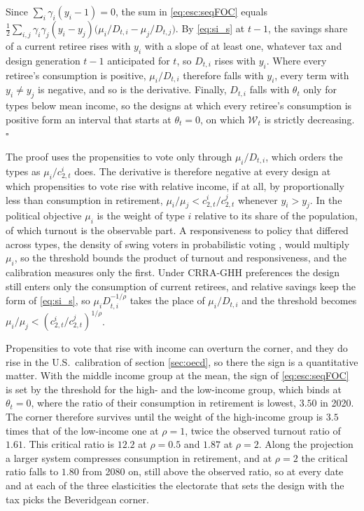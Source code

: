  Since $\sum_i\gamma_i(y_i-1) = 0$, the sum in \eqref{eq:esc:seqFOC} equals $\frac{1}{2}\sum_{i,j}\gamma_i\gamma_j(y_i-y_j)\big(\mu_i/D_{t,i}-\mu_j/D_{t,j}\big)$. By \eqref{eq:si_s} at $t-1$, the savings share of a current retiree rises with $y_i$ with a slope of at least one, whatever tax and design generation $t-1$ anticipated for $t$, so $D_{t,i}$ rises with $y_i$. Where every retiree's consumption is positive, $\mu_i/D_{t,i}$ therefore falls with $y_i$, every term with $y_i \neq y_j$ is negative, and so is the derivative. Finally, $D_{t,i}$ falls with $\theta_t$ only for types below mean income, so the designs at which every retiree's consumption is positive form an interval that starts at $\theta_t = 0$, on which $\mathcal{W}_t$ is strictly decreasing. $\square$

\bigskip
The proof uses the propensities to vote only through $\mu_i/D_{t,i}$, which orders the types as $\mu_i/c_{2,t}^i$ does. The derivative is therefore negative at every design at which propensities to vote rise with relative income, if at all, by proportionally less than consumption in retirement, $\mu_i/\mu_j < c_{2,t}^i/c_{2,t}^j$ whenever $y_i > y_j$. In the political objective $\mu_i$ is the weight of type $i$ relative to its share of the population, of which turnout is the observable part. A responsiveness to policy that differed across types, the density of swing voters in probabilistic voting \parencite{LindbeckW87a1}, would multiply $\mu_i$, so the threshold bounds the product of turnout and responsiveness, and the calibration measures only the first. Under CRRA-GHH preferences the design still enters only the consumption of current retirees, and relative savings keep the form of \eqref{eq:si_s}, so $\mu_iD_{t,i}^{-1/\rho}$ takes the place of $\mu_i/D_{t,i}$ and the threshold becomes $\mu_i/\mu_j < (c_{2,t}^i/c_{2,t}^j)^{1/\rho}$.

Propensities to vote that rise with income can overturn the corner, and they do rise in the U.S.\ calibration of section \ref{sec:oecd}, so there the sign is a quantitative matter. With the middle income group at the mean, the sign of \eqref{eq:esc:seqFOC} is set by the threshold for the high- and the low-income group, which binds at $\theta_t = 0$, where the ratio of their consumption in retirement is lowest, $3.50$ in 2020. The corner therefore survives until the weight of the high-income group is $3.5$ times that of the low-income one at $\rho = 1$, twice the observed turnout ratio of $1.61$. This critical ratio is $12.2$ at $\rho = 0.5$ and $1.87$ at $\rho = 2$. Along the projection a larger system compresses consumption in retirement, and at $\rho = 2$ the critical ratio falls to $1.80$ from 2080 on, still above the observed ratio, so at every date and at each of the three elasticities the electorate that sets the design with the tax picks the Beveridgean corner.

